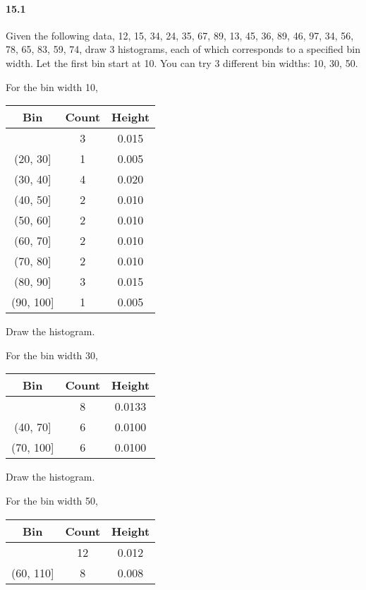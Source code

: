 \documentclass[11pt]{article} %
\begin{document}
\paragraph*{15.1} Given the following data, 12, 15, 34, 24, 35, 67, 89, 13, 45, 36, 89, 46, 97, 34, 56, 78, 65, 83, 59, 74, draw 3 histograms, each of which corresponds to a specified bin width. Let the first bin start at 10. You can try 3 different bin widths: 10, 30, 50. 

For the bin width 10, 
\begin{table}[h!]
\centering
\begin{tabular}{ccc} \\ \hline \hline 
Bin & Count & Height \\ \hline 
[10, 20] & 3 & 0.015 \\
(20, 30] & 1 & 0.005 \\
(30, 40] & 4 & 0.020 \\
(40, 50] & 2 & 0.010 \\
(50, 60] & 2 & 0.010 \\ 
(60, 70] & 2 & 0.010 \\
(70, 80] & 2 & 0.010 \\
(80, 90] & 3 & 0.015 \\
(90, 100] & 1 & 0.005 \\
\hline \hline
\end{tabular}
\end{table}

Draw the histogram. 

For the bin width 30, 
\begin{table}[h!]
\centering
\begin{tabular}{ccc} \\ \hline \hline 
Bin & Count & Height \\ \hline 
[10, 40] & 8 & 0.0133 \\
(40, 70] & 6 & 0.0100 \\
(70, 100] & 6 & 0.0100 \\
\hline \hline
\end{tabular}
\end{table}

Draw the histogram. 

For the bin width 50, 
\begin{table}[h!]
\centering
\begin{tabular}{ccc} \\ \hline \hline 
Bin & Count & Height \\ \hline 
[10, 60] & 12 & 0.012 \\
(60, 110] & 8 & 0.008 \\
\hline \hline
\end{tabular}
\end{table}
\end{document}
